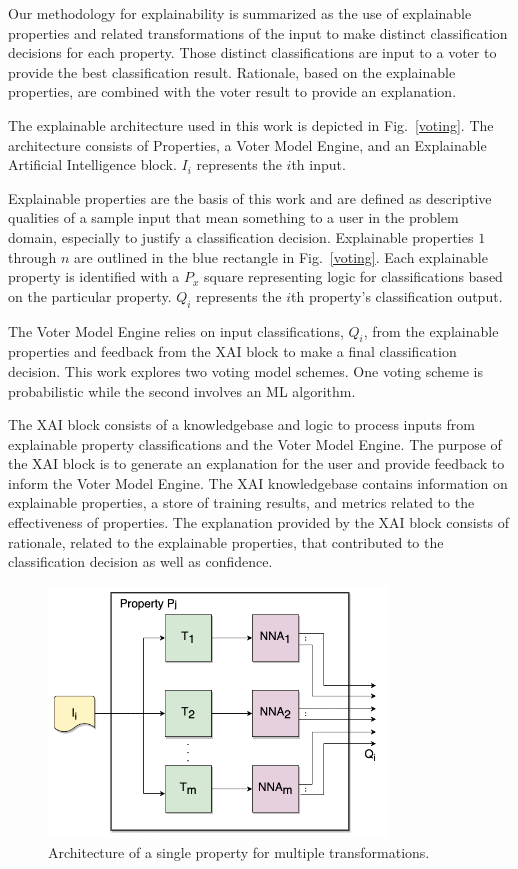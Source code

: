 \documentclass[conference]{IEEEtran}
\begin{document}
Our methodology for explainability is summarized as the use of explainable properties and related transformations of the input to make distinct classification decisions for each property.  Those distinct classifications are input to a voter to provide the best classification result.  Rationale, based on the explainable properties, are combined with the voter result to provide an explanation. 

The explainable architecture used in this work is depicted in Fig.~\ref{voting}.  The architecture consists of Properties, a Voter Model Engine, and an Explainable Artificial Intelligence block.  $I_i$ represents the $i$th input. 

Explainable properties are the basis of this work and are defined as descriptive qualities of a sample input that mean something to a user in the problem domain, especially to justify a classification decision.   Explainable properties $1$ through $n$ are outlined in the blue rectangle in Fig.~\ref{voting}.  Each explainable property is identified with a $P_x$ square representing logic for classifications based on the particular property.   $Q_i$ represents the $i$th property's classification output.

The Voter Model Engine relies on input classifications, $Q_i$, from the explainable properties and feedback from the XAI block to make a final classification decision.   This work explores two voting model schemes.  One voting scheme is probabilistic while the second involves an ML algorithm. 

The XAI block consists of a knowledgebase and logic to process inputs from explainable property classifications and the Voter Model Engine.   The purpose of the XAI block is to generate an explanation for the user and provide feedback to inform the Voter Model Engine.  The XAI knowledgebase contains information on explainable properties,  a store of training results, and metrics related to the effectiveness of properties.  The explanation provided by the XAI block consists of rationale, related to the explainable properties, that contributed to the classification decision as well as confidence. 

 \begin{figure}[htbp]
\centerline{\includegraphics[width=90mm]{./images/property_transforms.png}}
\caption{Architecture of a single property for multiple transformations.}
\label{proptrans}
\end{figure} 
\end{document}
